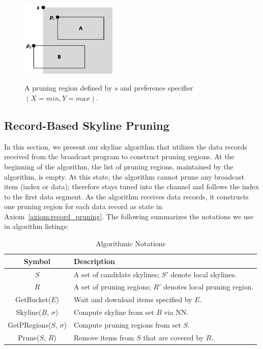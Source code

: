 \begin{figure}
\begin{center}
\includegraphics[width=1.8in]{Figures/pruning.eps}
\vspace*{-5pt} \caption{A pruning region defined by $s$ and
preference specifier $(X = min, Y = max)$.} \vspace*{-5pt}
\label{fig:pruning}
\end{center}
\end{figure}



\subsection{Record-Based Skyline Pruning}\label{sec-RPS}

In this section, we present our skyline algorithm that utilizes the data records received from the broadcast program to construct pruning regions. At the beginning of the algorithm, the list of pruning regions, maintained by the algorithm, is empty. At this state, the algorithm cannot prune any broadcast item (index or data); therefore stays tuned into the channel and follows the index to the first data segment. As the algorithm receives data records, it constructs one pruning region for each data record as state in Axiom~\ref{axiom:record_pruning}. The following summarizes the notations we use in algorithm listings:

\begin{table}[!h]
\centering \caption{Algorithmic Notations}\label{tab:alg}
\begin{tabular}{|c|p{2in}|}
\hline
{\bf Symbol} & {\bf Description}\\
\hline\hline
$S$ & A set of candidate skylines; $S'$ denote local skylines.\\
$R$ & A set of pruning regions; $R'$ denotes local pruning region.\\
GetBucket($E$) & Wait and download items specified by $E$. \\
Skyline($B$, $\sigma$) & Compute skyline from set $B$ via NN. \\
GetPRegions($S$, $\sigma$) & Compute pruning regions from set $S$. \\
Prune($S$, $R$) & Remove items from $S$ that are covered by $R$.\\
\hline
\end{tabular}
\end{table}

